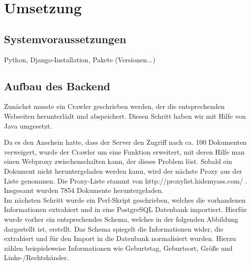 \chapter{Umsetzung}
\section{Systemvoraussetzungen}
Python, Django-Installation, Pakete (Versionen...)

\section{Aufbau des Backend}
\label{Backend}
Zunächst musste ein Crawler geschrieben werden, der die entsprechenden Webseiten herunterlädt und abspeichert. Diesen Schritt haben wir mit Hilfe von Java umgesetzt. 

Da es den Anschein hatte, dass der Server den Zugriff nach ca. 100 Dokumenten verweigert, wurde der Crawler um eine Funktion erweitert, mit deren Hilfe man einen Webproxy zwischenschalten kann, der dieses Problem löst. Sobald ein Dokument nicht heruntergeladen werden kann, wird der nächste Proxy aus der Liste genommen. Die Proxy-Liste stammt von http://proxylist.hidemyass.com/ \cite{HMA2015}. Insgesamt wurden 7854 Dokumente heruntergeladen.\\

Im nächsten Schritt wurde ein Perl-Skript geschrieben, welches die vorhandenen Informationen extrahiert und in eine PostgreSQL Datenbank importiert. Hierfür wurde vorher ein entsprechendes Schema, welches in der folgenden Abbildung dargestellt ist, erstellt. Das Schema spiegelt die Informationen wider, die extrahiert und für den Import in die Datenbank normalisiert wurden. Hierzu zählen beispielsweise Informationen wie Geburtstag, Geburtsort, Größe und Links-/Rechtshänder.

